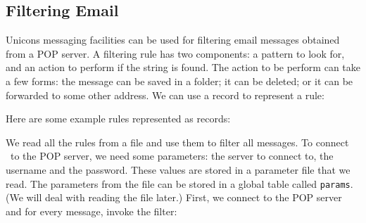 \subsection{Filtering Email}

Unicon{\textquotesingle}s messaging facilities can be used for filtering
email messages obtained from a POP server. A filtering rule has two
components: a pattern to look for, and an action to perform if the
string is found. The action to be perform can take a few forms: the
message can be saved in a folder; it can be deleted; or it can be
forwarded to some other address. We can use a record to represent a
rule:


Here are some example rules represented as records:



\bigskip

We read all the rules from a file and use them to filter all messages.
To connect \ to the POP server, we need some parameters: the server to
connect to, the username and the password. These values are stored in a
parameter file that we read. The parameters from the file can be stored
in a global table called \texttt{params}. (We will deal with reading
the file later.) First, we connect to the POP server and for every
message, invoke the filter:

